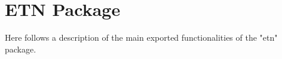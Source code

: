 \section{ETN Package}

Here follows a description of the main exported functionalities of the "etn" package.





